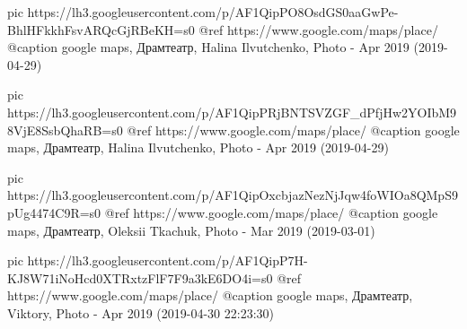      pic https://lh3.googleusercontent.com/p/AF1QipPO8OsdGS0aaGwPe-BhlHFkkhFsvARQcGjRBeKH=s0
     @ref https://www.google.com/maps/place/%
     @caption google maps, Драмтеатр, Halina Ilvutchenko, Photo - Apr 2019 (2019-04-29)

     pic https://lh3.googleusercontent.com/p/AF1QipPRjBNTSVZGF_dPfjHw2YOIbM98VjE8SsbQhaRB=s0
     @ref https://www.google.com/maps/place/%
     @caption google maps, Драмтеатр, Halina Ilvutchenko, Photo - Apr 2019 (2019-04-29)

     pic https://lh3.googleusercontent.com/p/AF1QipOxcbjazNezNjJqw4foWIOa8QMpS9pUg4474C9R=s0
     @ref https://www.google.com/maps/place/%
     @caption google maps, Драмтеатр, Oleksii Tkachuk, Photo - Mar 2019 (2019-03-01)

     pic https://lh3.googleusercontent.com/p/AF1QipP7H-KJ8W71iNoHcd0XTRxtzFlF7F9a3kE6DO4i=s0
     @ref https://www.google.com/maps/place/%
     @caption google maps, Драмтеатр, Viktory, Photo - Apr 2019 (2019-04-30 22:23:30)

